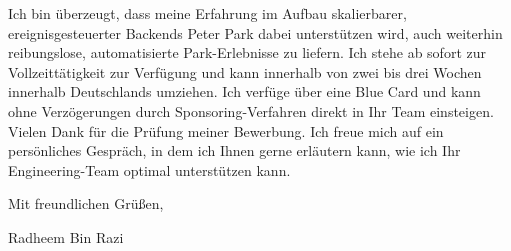 \documentclass[11pt,a4paper]{coverletter}
\begin{document}
Ich bin überzeugt, dass meine Erfahrung im Aufbau skalierbarer, ereignisgesteuerter Backends Peter Park dabei unterstützen wird, auch weiterhin reibungslose, automatisierte Park-Erlebnisse zu liefern. Ich stehe ab sofort zur Vollzeittätigkeit zur Verfügung und kann innerhalb von zwei bis drei Wochen innerhalb Deutschlands umziehen. Ich verfüge über eine Blue Card und kann ohne Verzögerungen durch Sponsoring-Verfahren direkt in Ihr Team einsteigen. Vielen Dank für die Prüfung meiner Bewerbung. Ich freue mich auf ein persönliches Gespräch, in dem ich Ihnen gerne erläutern kann, wie ich Ihr Engineering-Team optimal unterstützen kann.

\closing{Mit freundlichen Grüßen,}{Radheem Bin Razi}
\end{document}

